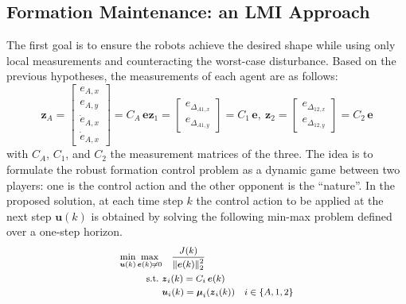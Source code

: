\documentclass{ifacconf}
\begin{document}
\subsection{Formation Maintenance: an LMI Approach}
The first goal is to ensure the robots achieve the desired shape 
while using only local measurements 
and counteracting the worst-case disturbance.
Based on the previous hypotheses, the measurements of 
each agent are as follows:
\begin{subequations}
    \begin{equation}
    \boldsymbol{z}_A = \begin{bmatrix}
        e_{A,x}  \\ e_{A,y} \\ \dot{e}_{A,x} \\ \dot{e}_{A,x}
    \end{bmatrix}= C_A \, \boldsymbol{e}
    \label{eq:measurement_drone}
\end{equation}
\begin{equation}
    \boldsymbol{z}_1 = \begin{bmatrix}
        e_{\Delta_{A1,x}} \\ e_{\Delta_{A1,y}}
    \end{bmatrix} = C_1 \, \boldsymbol{e}, \  
     \boldsymbol{z}_2 = \begin{bmatrix}
        e_{\Delta_{12,x}} \\ e_{\Delta_{12,y}}
    \end{bmatrix} = C_2 \, \boldsymbol{e}
\end{equation}
\label{eq:airground-continous_time-measurement}
\end{subequations}
with $C_A$, $C_1$, and $C_2$ the measurement matrices of the three.
The idea is to formulate the robust formation control 
problem as a dynamic game between two players: 
one is the control action and the other opponent is 
the ``nature''.
In the proposed solution, at each time step $k$ the control 
action to be applied at the next step $\boldsymbol{u}(k)$
is obtained by solving the following min-max problem 
defined over a one-step horizon.
\begin{equation}
\footnotesize
\begin{aligned}
    \min_{\boldsymbol{u}(k)} \max_{\boldsymbol{e}(k) \neq 0} &  \quad 
    \frac{J(k)}{\left\lVert \boldsymbol{e}(k)\right\rVert^2_2} \\
    \textrm{s.t.} \  &\boldsymbol{z}_i(k) = C_i \, \boldsymbol{e}(k) \\
    \quad & \boldsymbol{u}_{i}(k) = \boldsymbol{\mu}_i(\boldsymbol{z}_i(k)) \quad i \in \{A,1,2\} \\
\end{aligned}
\end{equation}
\end{document}
